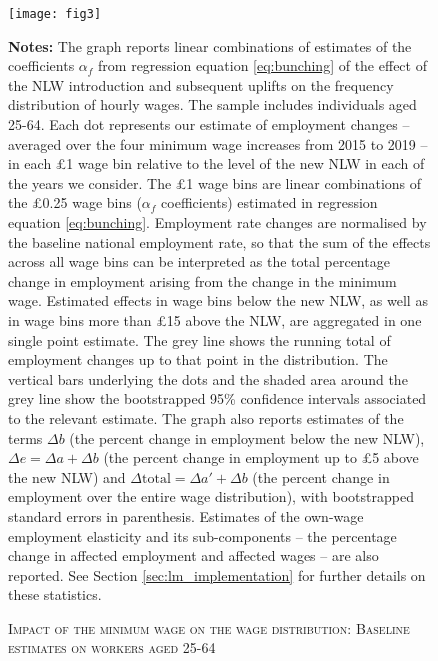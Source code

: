 \begin{figure}[h]
\caption{\textsc{Impact of the minimum wage on the wage distribution: Baseline estimates on workers aged 25-64}}
\label{fig:pooled}
\begin{center}
\texttt{[image: fig3]}
\end{center}
\par
\footnotesize{\textbf{Notes:} The graph reports linear combinations of estimates of the coefficients $\alpha_f$ from regression equation \ref{eq:bunching} of the effect of the NLW introduction and subsequent uplifts on the frequency distribution of hourly wages. The sample includes individuals aged 25-64. Each dot represents our estimate of employment changes -- averaged over the four minimum wage increases from 2015 to 2019 -- in each \pounds 1 wage bin relative to the level of the new NLW in each of the years we consider. The \pounds 1 wage bins are linear combinations of the \pounds 0.25 wage bins ($\alpha_f$ coefficients) estimated in regression equation \ref{eq:bunching}. Employment rate changes are normalised by the baseline national employment rate, so that the sum of the effects across all wage bins can be interpreted as the total percentage change in employment arising from the change in the minimum wage. Estimated effects in wage bins below the new NLW, as well as in wage bins more than £15 above the NLW, are aggregated in one single point estimate. The grey line shows the running total of employment changes up to that point in the distribution. The vertical bars underlying the dots and the shaded area around the grey line show the bootstrapped 95\% confidence intervals associated to the relevant estimate. The graph also reports estimates of the terms $\Delta b$ (the percent change in employment below the new NLW), $\Delta e = \Delta a + \Delta b$ (the percent change in employment up to \pounds 5 above the new NLW) and $\Delta \text{total}=\Delta a' + \Delta b$ (the percent change in employment over the entire wage distribution), with bootstrapped standard errors in parenthesis. Estimates of the own-wage employment elasticity and its sub-components -- the percentage change in affected employment and affected wages -- are also reported. See Section \ref{sec:lm_implementation} for further details on these statistics.}
\end{figure}


